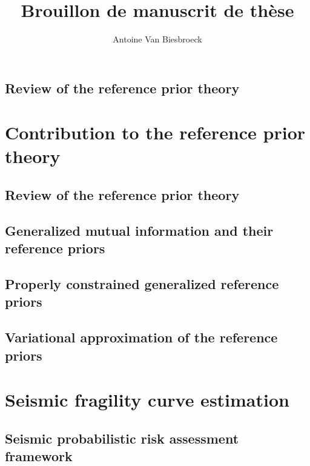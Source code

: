 \documentclass[a4paper]{book}
\title{Brouillon de manuscrit de thèse}
\author{Antoine Van Biesbroeck}
\begin{document}
\maketitle

\tableofcontents






\chapter*{Review of the reference prior theory}





\part{Contribution to the reference prior theory}

\chapter{Review of the reference prior theory}

\chapter{Generalized mutual information and their reference priors}

\chapter{Properly constrained generalized reference priors}

\chapter{Variational approximation of the reference priors}




\part{Seismic fragility curve estimation}


\chapter{Seismic probabilistic risk assessment framework}
\end{document}
